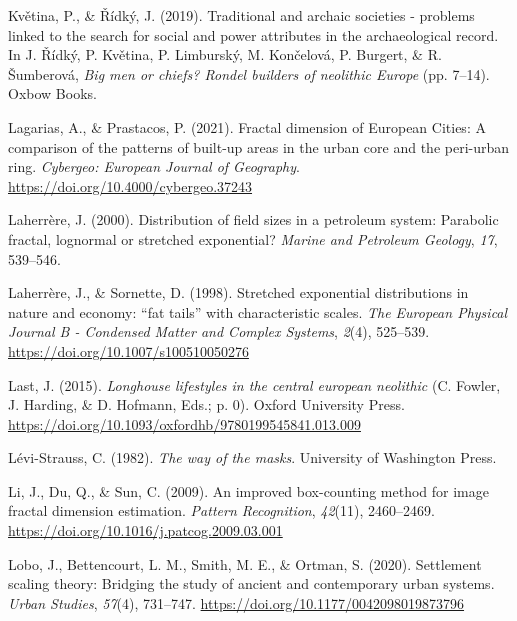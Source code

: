 \documentclass[
  12pt,
]{book}
\newlength{\cslhangindent}
\newlength{\cslentryspacingunit} %
\newenvironment{CSLReferences}[2] %
 {%
  \setlength{\parindent}{0pt}
  \ifodd #1
  \let\oldpar\par
  \def\par{\hangindent=\cslhangindent\oldpar}
  \fi
  \setlength{\parskip}{#2\cslentryspacingunit}
 }%
 {}
\begin{document}
\begin{CSLReferences}{1}{0}
\leavevmode{}%
Květina, P., \& Řídký, J. (2019). Traditional and archaic societies - problems linked to the search for social and power attributes in the archaeological record. In J. Řídký, P. Květina, P. Limburský, M. Končelová, P. Burgert, \& R. Šumberová, \emph{Big men or chiefs? {Rondel} builders of neolithic {Europe}} (pp. 7--14). {Oxbow Books}.

\leavevmode{}%
Lagarias, A., \& Prastacos, P. (2021). Fractal dimension of European Cities: A comparison of the patterns of built-up areas in the urban core and the peri-urban ring. \emph{Cybergeo: European Journal of Geography}. \url{https://doi.org/10.4000/cybergeo.37243}

\leavevmode{}%
Laherrère, J. (2000). Distribution of field sizes in a petroleum system: Parabolic fractal, lognormal or stretched exponential? \emph{Marine and Petroleum Geology}, \emph{17}, 539--546.

\leavevmode{}%
Laherrère, J., \& Sornette, D. (1998). Stretched exponential distributions in nature and economy: {``}fat tails{''} with characteristic scales. \emph{The European Physical Journal B - Condensed Matter and Complex Systems}, \emph{2}(4), 525--539. \url{https://doi.org/10.1007/s100510050276}

\leavevmode{}%
Last, J. (2015). \emph{Longhouse lifestyles in the central european neolithic} (C. Fowler, J. Harding, \& D. Hofmann, Eds.; p. 0). Oxford University Press. \url{https://doi.org/10.1093/oxfordhb/9780199545841.013.009}

\leavevmode{}%
Lévi-Strauss, C. (1982). \emph{The way of the masks}. University of Washington Press.

\leavevmode{}%
Li, J., Du, Q., \& Sun, C. (2009). An improved box-counting method for image fractal dimension estimation. \emph{Pattern Recognition}, \emph{42}(11), 2460--2469. \url{https://doi.org/10.1016/j.patcog.2009.03.001}

\leavevmode{}%
Lobo, J., Bettencourt, L. M., Smith, M. E., \& Ortman, S. (2020). Settlement scaling theory: Bridging the study of ancient and contemporary urban systems. \emph{Urban Studies}, \emph{57}(4), 731--747. \url{https://doi.org/10.1177/0042098019873796}


\end{CSLReferences}
\end{document}
